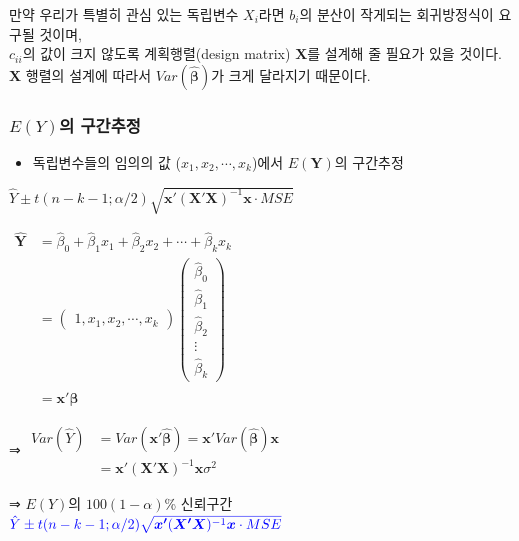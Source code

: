 \documentclass[
]{article}
\providecommand{\tightlist}{%
  \setlength{\itemsep}{0pt}\setlength{\parskip}{0pt}}
\begin{document}
만약 우리가 특별히 관심 있는 독립변수 \(X_i\)라면 \(b_i\)의 분산이
작게되는 회귀방정식이 요구될 것이며,\\
\(c_{ii}\)의 값이 크지 않도록 계획행렬(design matrix)
\(\boldsymbol{X}\)를 설계해 줄 필요가 있을 것이다.\\
\(\boldsymbol{X}\) 행렬의 설계에 따라서
\(Var(\boldsymbol{\hat{\beta}})\)가 크게 달라지기 때문이다.

\hypertarget{eyuxc758-uxad6cuxac04uxcd94uxc815}{%
\subsubsection{\texorpdfstring{\(E(Y)\)의
구간추정}{E(Y)의 구간추정}}\label{eyuxc758-uxad6cuxac04uxcd94uxc815}}

\begin{itemize}
\tightlist
\item
  독립변수들의 임의의 값 (\(x_1, x_2, \cdots, x_k\))에서
  \(E(\boldsymbol{Y})\)의 구간추정
\end{itemize}

\(\hat{Y} \pm t(n-k-1;\alpha/2)\sqrt{\boldsymbol{x'}(\boldsymbol{X'X})^{-1}\boldsymbol{x}\cdot MSE}\)

\(\begin{aligned}\boldsymbol{\hat{Y}}&=\hat{\beta}_0 + \hat{\beta}_1 x_1 + \hat{\beta}_2 x_2 + \cdots + \hat{\beta}_k x_k \\&= \begin{pmatrix} 1, x_1,x_2,\cdots,x_k \end{pmatrix} \begin{pmatrix} \hat{\beta}_0 \\ \hat{\beta}_1 \\ \hat{\beta}_2 \\ \vdots \\ \hat{\beta}_k \end{pmatrix} \\&= \boldsymbol{x'\hat{\beta}}\end{aligned}\)

⇒
\(\begin{aligned} Var(\hat{Y})&=Var(\boldsymbol{x'\hat{\beta}})=\boldsymbol{x'}Var(\boldsymbol{\hat{\beta}})\boldsymbol{x} \\&=\boldsymbol{x}'(\boldsymbol{X'X})^{-1}\boldsymbol{x}\sigma^2 \end{aligned}\)

⇒ \(E(Y)\)의 \(100(1-\alpha)\)\% 신뢰구간\\
\(\color{blue}{\hat{Y} \pm t(n-k-1;\alpha/2)\sqrt{\boldsymbol{x'}(\boldsymbol{X'X})^{-1}\boldsymbol{x}\cdot MSE}}\)
\end{document}
